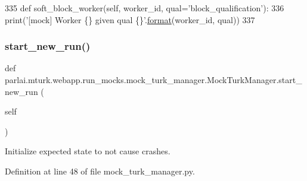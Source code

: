 \begin{DoxyCode}
335     \textcolor{keyword}{def }soft\_block\_worker(self, worker\_id, qual='block\_qualification'):
336         print(\textcolor{stringliteral}{'[mock] Worker \{\} given qual \{\}'}.\hyperlink{namespaceparlai_1_1chat__service_1_1services_1_1messenger_1_1shared__utils_a32e2e2022b824fbaf80c747160b52a76}{format}(worker\_id, qual))
337 
\end{DoxyCode}
\mbox{\label{classparlai_1_1mturk_1_1webapp_1_1run__mocks_1_1mock__turk__manager_1_1MockTurkManager_a32f3b631a0c6cfa67bfc8a214c453bc2}} 
\subsubsection{\texorpdfstring{start\+\_\+new\+\_\+run()}{start\_new\_run()}}
{\footnotesize\ttfamily def parlai.\+mturk.\+webapp.\+run\+\_\+mocks.\+mock\+\_\+turk\+\_\+manager.\+Mock\+Turk\+Manager.\+start\+\_\+new\+\_\+run (\begin{DoxyParamCaption}\item[{}]{self }\end{DoxyParamCaption})}

\begin{DoxyVerb}Initialize expected state to not cause crashes.
\end{DoxyVerb}
 

Definition at line 48 of file mock\+\_\+turk\+\_\+manager.\+py.


